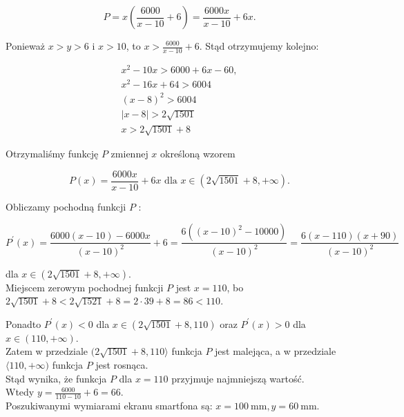 \documentclass[10pt]{article}
\begin{document}
$$
P=x\left(\frac{6000}{x-10}+6\right)=\frac{6000 x}{x-10}+6 x .
$$

Ponieważ $x>y>6$ i $x>10$, to $x>\frac{6000}{x-10}+6$. Stąd otrzymujemy kolejno:

$$
\begin{gathered}
x^{2}-10 x>6000+6 x-60, \\
x^{2}-16 x+64>6004 \\
(x-8)^{2}>6004 \\
|x-8|>2 \sqrt{1501} \\
x>2 \sqrt{1501}+8
\end{gathered}
$$

Otrzymaliśmy funkcję $P$ zmiennej $x$ określoną wzorem

$$
P(x)=\frac{6000 x}{x-10}+6 x \text { dla } x \in(2 \sqrt{1501}+8,+\infty) .
$$

Obliczamy pochodną funkcji $P$ :

$$
P^{\prime}(x)=\frac{6000(x-10)-6000 x}{(x-10)^{2}}+6=\frac{6\left((x-10)^{2}-10000\right)}{(x-10)^{2}}=\frac{6(x-110)(x+90)}{(x-10)^{2}}
$$

dla $x \in(2 \sqrt{1501}+8,+\infty)$.\\
Miejscem zerowym pochodnej funkcji $P$ jest $x=110$, bo $2 \sqrt{1501}+8<2 \sqrt{1521}+8=2 \cdot 39+8=86<110$.

Ponadto $P^{\prime}(x)<0$ dla $x \in(2 \sqrt{1501}+8,110)$ oraz $P^{\prime}(x)>0$ dla $x \in(110,+\infty)$.\\
Zatem w przedziale $(2 \sqrt{1501}+8,110\rangle$ funkcja $P$ jest malejąca, a w przedziale $\langle 110,+\infty)$ funkcja $P$ jest rosnąca.\\
Stąd wynika, że funkcja $P$ dla $x=110$ przyjmuje najmniejszą wartość.\\
Wtedy $y=\frac{6000}{110-10}+6=66$.\\
Poszukiwanymi wymiarami ekranu smartfona są: $x=100 \mathrm{~mm}, y=60 \mathrm{~mm}$.
\end{document}
